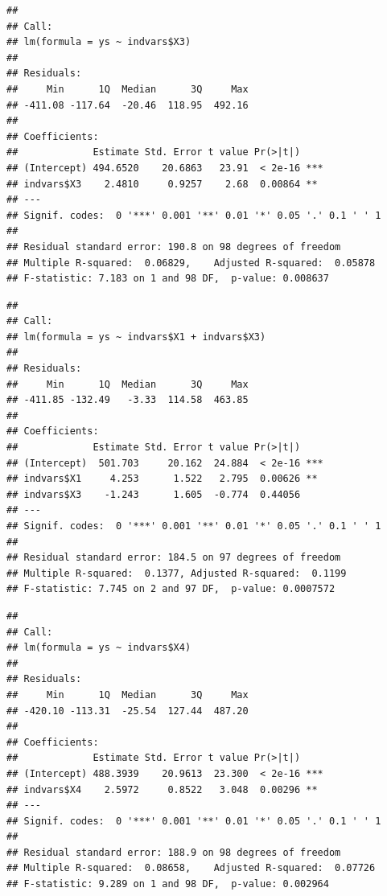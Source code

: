 \documentclass[
]{book}
\newenvironment{Shaded}{\begin{snugshade}}{\end{snugshade}}
\newcommand{\FunctionTok}[1]{\textcolor[rgb]{0.00,0.00,0.00}{#1}}
\newcommand{\NormalTok}[1]{#1}
\newcommand{\OtherTok}[1]{\textcolor[rgb]{0.56,0.35,0.01}{#1}}
\newcommand{\SpecialCharTok}[1]{\textcolor[rgb]{0.00,0.00,0.00}{#1}}
\begin{document}
\begin{verbatim}
## 
## Call:
## lm(formula = ys ~ indvars$X3)
## 
## Residuals:
##     Min      1Q  Median      3Q     Max 
## -411.08 -117.64  -20.46  118.95  492.16 
## 
## Coefficients:
##             Estimate Std. Error t value Pr(>|t|)    
## (Intercept) 494.6520    20.6863   23.91  < 2e-16 ***
## indvars$X3    2.4810     0.9257    2.68  0.00864 ** 
## ---
## Signif. codes:  0 '***' 0.001 '**' 0.01 '*' 0.05 '.' 0.1 ' ' 1
## 
## Residual standard error: 190.8 on 98 degrees of freedom
## Multiple R-squared:  0.06829,    Adjusted R-squared:  0.05878 
## F-statistic: 7.183 on 1 and 98 DF,  p-value: 0.008637
\end{verbatim}

\begin{Shaded}
\end{Shaded}

\begin{verbatim}
## 
## Call:
## lm(formula = ys ~ indvars$X1 + indvars$X3)
## 
## Residuals:
##     Min      1Q  Median      3Q     Max 
## -411.85 -132.49   -3.33  114.58  463.85 
## 
## Coefficients:
##             Estimate Std. Error t value Pr(>|t|)    
## (Intercept)  501.703     20.162  24.884  < 2e-16 ***
## indvars$X1     4.253      1.522   2.795  0.00626 ** 
## indvars$X3    -1.243      1.605  -0.774  0.44056    
## ---
## Signif. codes:  0 '***' 0.001 '**' 0.01 '*' 0.05 '.' 0.1 ' ' 1
## 
## Residual standard error: 184.5 on 97 degrees of freedom
## Multiple R-squared:  0.1377, Adjusted R-squared:  0.1199 
## F-statistic: 7.745 on 2 and 97 DF,  p-value: 0.0007572
\end{verbatim}

\begin{Shaded}
\end{Shaded}

\begin{verbatim}
## 
## Call:
## lm(formula = ys ~ indvars$X4)
## 
## Residuals:
##     Min      1Q  Median      3Q     Max 
## -420.10 -113.31  -25.54  127.44  487.20 
## 
## Coefficients:
##             Estimate Std. Error t value Pr(>|t|)    
## (Intercept) 488.3939    20.9613  23.300  < 2e-16 ***
## indvars$X4    2.5972     0.8522   3.048  0.00296 ** 
## ---
## Signif. codes:  0 '***' 0.001 '**' 0.01 '*' 0.05 '.' 0.1 ' ' 1
## 
## Residual standard error: 188.9 on 98 degrees of freedom
## Multiple R-squared:  0.08658,    Adjusted R-squared:  0.07726 
## F-statistic: 9.289 on 1 and 98 DF,  p-value: 0.002964
\end{verbatim}
\end{document}
